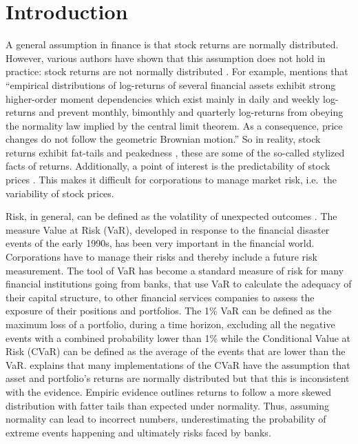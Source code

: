 \documentclass[a4paper, nobind]{templates/ociamthesis}
\begin{document}
\hypertarget{introduction}{%
\chapter*{Introduction}\label{introduction}}

\adjustmtc
{}

\noindent A general assumption in finance is that stock returns are normally distributed. However, various authors have shown that this assumption does not hold in practice: stock returns are not normally distributed \autocites[Among which][]{theodossiou2000,subbotin1923,theodossiou2015}. For example, \textcite{theodossiou2000} mentions that ``empirical distributions of log-returns of several financial assets exhibit strong higher-order moment dependencies which exist mainly in daily and weekly log-returns and prevent monthly, bimonthly and quarterly log-returns from obeying the normality law implied by the central limit theorem. As a consequence, price changes do not follow the geometric Brownian motion.'' So in reality, stock returns exhibit fat-tails and peakedness \autocite{Officer1972}, these are some of the so-called stylized facts of returns. Additionally, a point of interest is the predictability of stock prices \autocite{fama1965,Fama1970,welch2008}. This makes it difficult for corporations to manage market risk, i.e.~the variability of stock prices. ~

Risk, in general, can be defined as the volatility of unexpected outcomes \autocite{jorion2007}. The measure Value at Risk (VaR), developed in response to the financial disaster events of the early 1990s, has been very important in the financial world. Corporations have to manage their risks and thereby include a future risk measurement. The tool of VaR has become a standard measure of risk for many financial institutions going from banks, that use VaR to calculate the adequacy of their capital structure, to other financial services companies to assess the exposure of their positions and portfolios. The 1\% VaR can be defined as the maximum loss of a portfolio, during a time horizon, excluding all the negative events with a combined probability lower than 1\% while the Conditional Value at Risk (CVaR) can be defined as the average of the events that are lower than the VaR. \textcite{bali2008} explains that many implementations of the CVaR have the assumption that asset and portfolio's returns are normally distributed but that this is inconsistent with the evidence. Empiric evidence outlines returns to follow a more skewed distribution with fatter tails than expected under normality. Thus, assuming normality can lead to incorrect numbers, underestimating the probability of extreme events happening and ultimately risks faced by banks.
\end{document}
